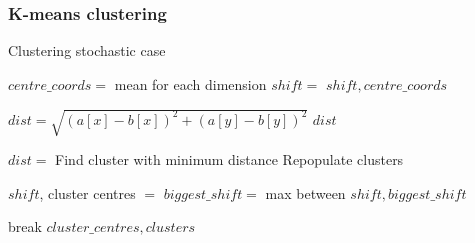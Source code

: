 \subsubsection{K-means clustering}
\newpage
\begin{algorithm}
\caption{Clustering stochastic case}
 \begin{algorithmic}[1]
    \Statex
    
    	\Statex
    		\State $centre\_coords = $ mean for each dimension
    		\State $shift = $
    		\State \Return $shift, centre\_coords$
    	\EndFunction
    
    	\Statex
    		\State $dist = \sqrt{(a[x] - b[x])^2+(a[y] - b[y])^2}$
    		\State \Return $dist$
    	\EndFunction
      
      	\Statex
      				\State $dist = $
      			\EndFor
      			\State Find cluster with minimum distance
      			\State Repopulate clusters
      		\EndFor
      		
      			\State $shift$, cluster centres $=$ 
      			\State $biggest\_shift = $ max between $shift, biggest\_shift$
      			
      		\EndFor
      			\State break
      		\EndIf
      	\EndWhile
      \State \Return $cluster\_centres, clusters$
    \EndFunction

  \end{algorithmic}
\end{algorithm}

